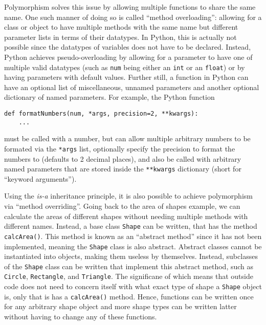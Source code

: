 \documentclass[11pt]{article}
\begin{document}
Polymorphism solves this issue by allowing multiple functions to share the same name. One such manner of doing so is called ``method overloading'': allowing for a class or object to have multiple methods with the same name but different parameter lists in terms of their datatypes. In Python, this is actually not possible since the datatypes of variables does not have to be declared. Instead, Python achieves pseudo-overloading by allowing for a parameter to have one of multiple valid datatypes (such as \texttt{num} being either an \texttt{int} or an \texttt{float}) or by having parameters with default values. Further still, a function in Python can have an optional list of miscellaneous, unnamed parameters and another optional dictionary of named parameters. For example, the Python function

\begin{verbatim}
def formatNumbers(num, *args, precision=2, **kwargs):
    ...
\end{verbatim}

\noindent
must be called with a number, but can allow multiple arbitrary numbers to be formated via the \texttt{*args} list, optionally specify the precision to format the numbers to (defaults to 2 decimal places), and also be called with arbitrary named parameters that are stored inside the \texttt{**kwargs} dictionary (short for ``keyword arguments'').

Using the \textit{is-a} inheritance principle, it is also possible to achieve polymorphism via ``method overriding''. Going back to the area of shapes example, we can calculate the areas of different shapes without needing multiple methods with different names. Instead, a base class \texttt{Shape} can be written, that has the method \texttt{calcArea()}. This method is known as an ``abstract method'' since it has not been implemented, meaning the \texttt{Shape} class is also abstract. Abstract classes cannot be instantiated into objects, making them useless by themselves. Instead, subclasses of the \texttt{Shape} class can be written that implement this abstract method, such as \texttt{Circle}, \texttt{Rectangle}, and \texttt{Triangle}. The significane of which means that outside code does not need to concern itself with what exact type of shape a \texttt{Shape} object is, only that is has a \texttt{calcArea()} method. Hence, functions can be written once for any arbitrary shape object and more shape types can be written latter without having to change any of these functions.
\end{document}
